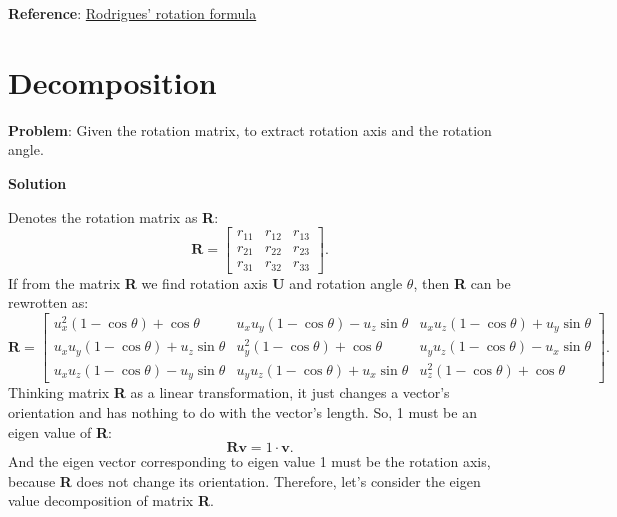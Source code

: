 \documentclass{article}
\begin{document}
\textbf{Reference}: \href{https://en.wikipedia.org/wiki/Rodrigues%27_rotation_formula}{Rodrigues' rotation formula}

\section{Decomposition}
\textbf{Problem}: Given the rotation matrix, to extract rotation axis and the rotation angle.

\noindent \textbf{Solution}

Denotes the rotation matrix as \textbf{R}:
\begin{displaymath}
\mathbf{R} = \begin{bmatrix}
r_{11} & r_{12} & r_{13} \\
r_{21} & r_{22} & r_{23} \\
r_{31} & r_{32} & r_{33}
\end{bmatrix}.
\end{displaymath}
If from the matrix \textbf{R} we find rotation axis \textbf{U} and rotation angle $\theta$, then \textbf{R} can be rewrotten as:
\begin{displaymath}
\mathbf{R} = \begin{bmatrix}
u_x^2(1-\cos{\theta})+\cos{\theta} & u_xu_y(1-\cos{\theta})-u_z\sin{\theta} & u_xu_z(1-\cos{\theta})+u_y\sin{\theta} \\
u_xu_y(1-\cos{\theta})+u_z\sin{\theta} & u_y^2(1-\cos{\theta})+\cos{\theta} & u_yu_z(1-\cos{\theta})-u_x\sin{\theta} \\
u_xu_z(1-\cos{\theta})-u_y\sin{\theta} &  u_yu_z(1-\cos{\theta})+u_x\sin{\theta} & u_z^2(1-\cos{\theta})+\cos{\theta}
\end{bmatrix}.
\end{displaymath}
Thinking matrix \textbf{R} as a linear transformation, it just changes a vector's orientation and has nothing to do with the vector's length. So, 1 must be an eigen value of \textbf{R}:
\begin{displaymath}
\mathbf{R}\mathbf{v} = 1\cdot\mathbf{v}.
\end{displaymath}
And the eigen vector corresponding to eigen value 1 must be the rotation axis, because \textbf{R} does not change its orientation. Therefore, let's consider the eigen value decomposition of matrix \textbf{R}.
\end{document}
